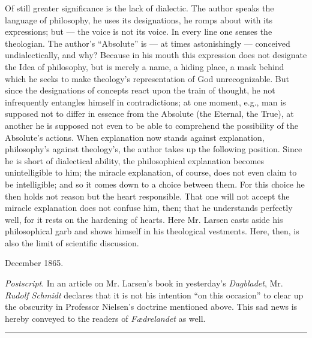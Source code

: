 \documentclass[12pt,a4paper,openany]{book}
\newcommand{\piecerule}{\par\begin{center}\rule{1.5cm}{0.4pt}\end{center}\par}
\begin{document}
Of still greater significance is the lack of dialectic. The author speaks
the language of philosophy, he uses its designations, he romps about with
its expressions; but --- the voice is not its voice. In every line one
senses the theologian.
The author's ``Absolute'' is --- at times astonishingly --- conceived
undialectically, and why? Because in his mouth this expression does not
designate the Idea of philosophy, but is merely a name, a hiding place, a
mask behind which he seeks to make theology's representation of God
unrecognizable. But since the designations of concepts react upon the
train of thought, he not infrequently entangles himself in contradictions;
at one moment, e.g., man is supposed not to differ in essence from the
Absolute (the Eternal, the True), at another he is supposed not even to be
able to comprehend the possibility of the Absolute's actions. When
explanation now stands against explanation, philosophy's against
theology's, the author takes up the following position. Since he is short
of dialectical ability, the philosophical explanation becomes
unintelligible to him; the miracle explanation, of course, does not even
claim to be intelligible; and so it comes down to a choice between them.
For this choice he then holds not reason but the heart responsible. That
one will not accept the miracle explanation does not confuse him, then;
that he understands perfectly well, for it rests on the hardening of
hearts. Here Mr. Larsen casts aside his philosophical garb and shows
himself in his theological vestments. Here, then, is also the limit of
scientific discussion.

December 1865.

\emph{Postscript}. In an article on Mr. Larsen's book in yesterday's
\emph{Dagbladet}, Mr. \emph{Rudolf Schmidt} declares that it is not his
intention ``on this occasion'' to clear up the obscurity in Professor
Nielsen's doctrine mentioned above. This sad news is hereby conveyed to
the readers of \emph{Fædrelandet} as well.
\piecerule
\end{document}
